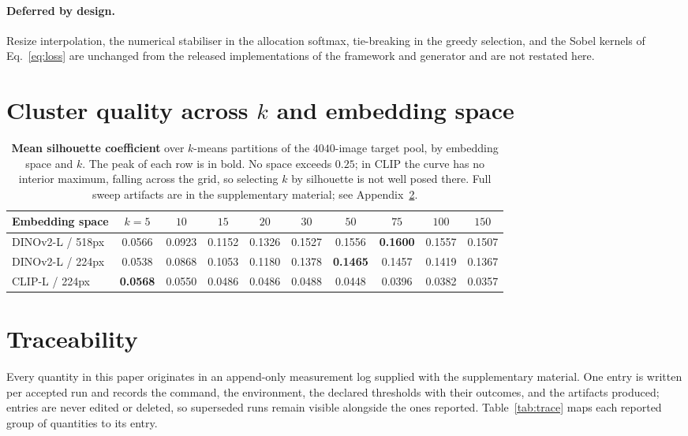 \documentclass{article}
\begin{document}
\paragraph{Deferred by design.}
Resize interpolation, the numerical stabiliser in the allocation softmax,
tie-breaking in the greedy selection, and the Sobel kernels of
Eq.~\ref{eq:loss} are unchanged from the released implementations of the
framework and generator and are not restated here.

\section{Cluster quality across $k$ and embedding space}
\label{app:clusters}

\begin{table}[h]
\caption{\textbf{Mean silhouette coefficient} over $k$-means partitions of the
$4040$-image target pool, by embedding space and $k$. The peak of each row is in
bold. No space exceeds $0.25$; in CLIP the curve has no interior maximum,
falling across the grid, so selecting $k$ by silhouette is not well posed there.
Full sweep artifacts are in the supplementary material; see Appendix~\ref{app:trace}.}
\label{tab:silhouette}
\begin{center}
\footnotesize
\setlength{\tabcolsep}{3.5pt}
\begin{tabular}{@{}lccccccccc@{}}
\toprule
Embedding space & $k{=}5$ & $10$ & $15$ & $20$ & $30$ & $50$ & $75$ & $100$ & $150$ \\
\midrule
DINOv2-L / 518px & 0.0566 & 0.0923 & 0.1152 & 0.1326 & 0.1527 & 0.1556 & \textbf{0.1600} & 0.1557 & 0.1507 \\
DINOv2-L / 224px & 0.0538 & 0.0868 & 0.1053 & 0.1180 & 0.1378 & \textbf{0.1465} & 0.1457 & 0.1419 & 0.1367 \\
CLIP-L / 224px   & \textbf{0.0568} & 0.0550 & 0.0486 & 0.0486 & 0.0488 & 0.0448 & 0.0396 & 0.0382 & 0.0357 \\
\bottomrule
\end{tabular}
\end{center}
\end{table}

\section{Traceability}
\label{app:trace}

Every quantity in this paper originates in an append-only measurement log
supplied with the supplementary material. One entry is written per accepted run
and records the command, the environment, the declared thresholds with their
outcomes, and the artifacts produced; entries are never edited or deleted, so
superseded runs remain visible alongside the ones reported. Table~\ref{tab:trace}
maps each reported group of quantities to its entry.
\end{document}
